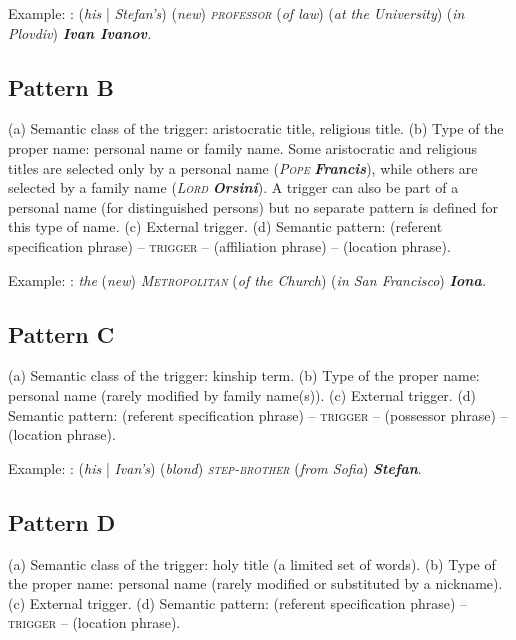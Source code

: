 \documentclass[output=paper]{langsci/langscibook}
\newcommand{\trigger}[1]{\textsc{#1}}
\begin{document}
Example: : (\textit{his} | \textit{Stefan's}) (\textit{new})
\textit{\trigger{professor}} (\textit{of law}) (\textit{at the
University}) (\textit{in Plovdiv}) \textbf{\textit{Ivan
Ivanov}}\textit{.}



\subsection{Pattern B}

(a) Semantic class of the trigger: aristocratic title, religious title.
(b) Type of the proper name: personal name or family name. Some
aristocratic and religious titles are selected only by a personal name
(\textit{\trigger{Pope}}\textit{ }\textbf{\textit{Francis}}), while
others are selected by a family name (\textit{\trigger{Lord}}\textit{
}\textbf{\textit{Orsini}}). A trigger can also be part of a personal
name (for distinguished persons) but no separate pattern is defined for this type of name\textit{.} (c) External trigger. (d) Semantic pattern:
(referent specification phrase) – \trigger{trigger} – (affiliation
phrase) – (location phrase).



Example: : \textit{the }(\textit{new})\textit{
}\textit{\trigger{Metropolitan}} (\textit{of the Church}) (\textit{in San
Francisco})\textit{ }\textbf{\textit{Iona}}\textit{.}

\subsection{Pattern C}

(a) Semantic class of the trigger: kinship term. (b) Type of the proper
name: personal name (rarely modified by family name(s)). (c) External
trigger. (d) Semantic pattern: (referent specification phrase) –
\trigger{trigger} – (possessor phrase) – (location phrase).



Example: : (\textit{his} | \textit{Ivan's}) (\textit{blond})\textit{
}\textit{\trigger{step-brother}} (\textit{from Sofia})\textit{
}\textbf{\textit{Stefan}}.

\subsection{Pattern D}

(a) Semantic class of the trigger: holy title (a limited set of words).
(b) Type of the proper name: personal name (rarely modified or
substituted by a nickname). (c) External trigger. (d) Semantic pattern:
(referent specification phrase) – \trigger{trigger} – (location phrase).
\end{document}
